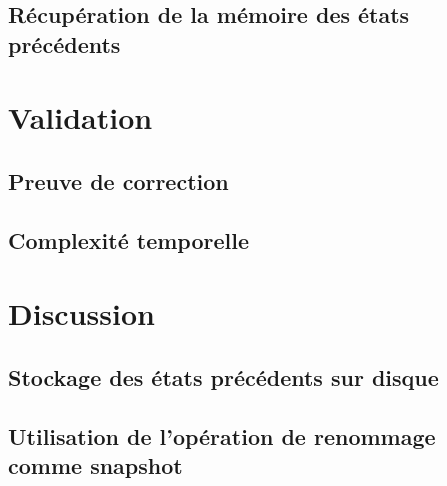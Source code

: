 \documentclass[12pt]{thesul}
\begin{document}

\subsection{Récupération de la mémoire des états précédents}
\section{Validation}
\subsection{Preuve de correction}
\subsection{Complexité temporelle}
\section{Discussion}
\subsection{Stockage des états précédents sur disque}
\subsection{Utilisation de l'opération de renommage comme snapshot}
\end{document}
